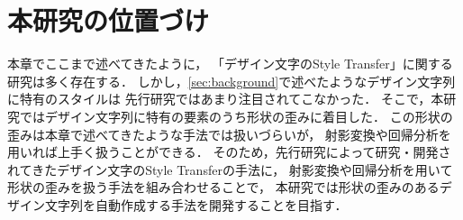 \documentclass[\homedir/main.tex]{subfiles}
\begin{document}
\section{本研究の位置づけ}\label{sec:positioning}
本章でここまで述べてきたように，
「デザイン文字のStyle Transfer」に関する研究は多く存在する．
しかし，\cref{sec:background}で述べたようなデザイン文字列に特有のスタイルは
先行研究ではあまり注目されてこなかった．
そこで，本研究ではデザイン文字列に特有の要素のうち形状の歪みに着目した．
この形状の歪みは本章で述べてきたような手法では扱いづらいが，
射影変換や回帰分析を用いれば上手く扱うことができる．
そのため，先行研究によって研究・開発されてきたデザイン文字のStyle Transferの手法に，
射影変換や回帰分析を用いて形状の歪みを扱う手法を組み合わせることで，
本研究では形状の歪みのあるデザイン文字列を自動作成する手法を開発することを目指す．
\printBibForSubfiles
\end{document}
